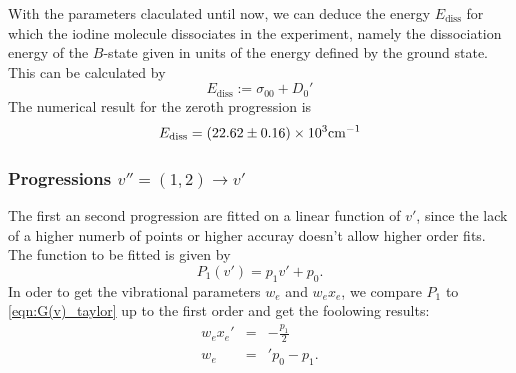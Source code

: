 With the parameters claculated until now, we can deduce the energy $E_\mathrm{diss}$ 
for which the iodine molecule dissociates in the experiment, 
namely the dissociation energy of the $B$-state given in units of the 
energy defined by the ground state. This can be calculated by
\begin{equation}
    E_\mathrm{diss} := \sigma_{00} + D_0'
    \label{eq:E_diss}
\end{equation}
The numerical result for the zeroth progression is
\begin{equation}
    E_\mathrm{diss} = \left(22.62 \pm 0.16\right) \times 10^{3} \mathrm{cm^{-1}}
\end{equation}


\subsubsection{Progressions $v'' = (1, 2) \rightarrow v'$}
The first an second progression are fitted on a linear function of $v'$, since 
the lack of a higher numerb of points or higher accuray doesn't allow higher order fits.
The function to be fitted is given by
\begin{equation}
    P_1(v') = p_1 v' + p_0.
\end{equation}
In oder to get the vibrational parameters $w_e$ and $w_e x_e$, we compare $P_1$ to 
\eqref{eqn:G(v)_taylor} up to the first order and get the foolowing results: 
\begin{eqnarray}
    w_e x_e' &=& -\frac{p_1}{2} \\
    w_e &=&' p_0 - p_1.
\end{eqnarray}

